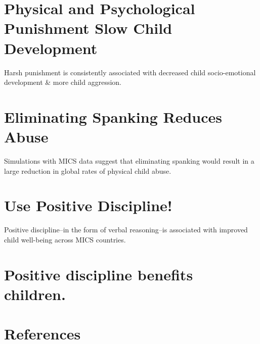 \documentclass[
  letterpaper,
  DIV=11,
  numbers=noendperiod]{scrartcl}
\begin{document}
\hypertarget{physical-and-psychological-punishment-slow-child-development}{%
\section{Physical and Psychological Punishment Slow Child
Development}\label{physical-and-psychological-punishment-slow-child-development}}

Harsh punishment is consistently associated with decreased child
socio-emotional development \& more child aggression.

\hypertarget{eliminating-spanking-reduces-abuse}{%
\section{Eliminating Spanking Reduces
Abuse}\label{eliminating-spanking-reduces-abuse}}

Simulations with MICS data suggest that eliminating spanking would
result in a large reduction in global rates of physical child abuse.

\hypertarget{use-positive-discipline}{%
\section{Use Positive Discipline!}\label{use-positive-discipline}}

Positive discipline--in the form of verbal reasoning--is associated with
improved child well-being across MICS countries.

\hypertarget{positive-discipline-benefits-children.}{%
\section{Positive discipline benefits
children.}\label{positive-discipline-benefits-children.}}

\hypertarget{references}{%
\section*{References}\label{references}}
\end{document}
